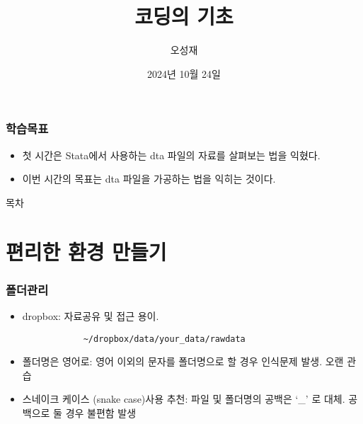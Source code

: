 \documentclass[aspectratio=169,xcolor=dvipsnames,handout]{beamer}
\title{코딩의 기초}
\author{오성재}
\institute[CNU]
{\relax
    전북대학교 Stata 특강\
}
\date{2024년 10월 24일}
\begin{document}

\frame{\titlepage}

\begin{frame}
\frametitle{학습목표}
    \begin{itemize}[<+->]
    \item 첫 시간은 Stata에서 사용하는 dta 파일의 자료를 살펴보는 법을 익혔다.
    \item 이번 시간의 목표는 dta 파일을 가공하는 법을 익히는 것이다.
    \end{itemize}
\end{frame}

\begin{frame}{목차}
    \small
    \tableofcontents[hideallsubsections]
\end{frame}

\section{편리한 환경 만들기}

\begin{frame}[fragile]
    \frametitle{폴더관리}
    \begin{itemize}[<+->]
        \item dropbox: 자료공유 및 접근 용이.
        \begin{verbatim}
            ~/dropbox/data/your_data/rawdata
        \end{verbatim}
        \item 폴더명은 영어로: 영어 이외의 문자를 폴더명으로 할 경우 인식문제 발생. 오랜 관습
        \item 스네이크 케이스 (snake case)사용 추천: 파일 및 폴더명의 공백은 `\_' 로 대체. 공백으로 둘 경우 불편함 발생
    \end{itemize}
\end{frame}
\end{document}
